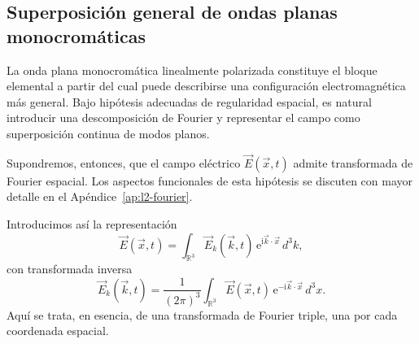\documentclass[12pt,a4paper]{article}
\theoremstyle{definition}
\theoremstyle{plain}
\numberwithin{equation}{section}
\theoremstyle{remark}
\newcommand{\ii}{\mathrm{i}}
\newcommand{\ee}{\mathrm{e}}
\newcommand{\E}{\vec{E}}
\begin{document}
\subsection{Superposición general de ondas planas monocromáticas}

La onda plana monocromática linealmente polarizada constituye el bloque elemental a partir del cual puede describirse una configuración electromagnética más general. Bajo hipótesis adecuadas de regularidad espacial, es natural introducir una descomposición de Fourier y representar el campo como superposición continua de modos planos.

Supondremos, entonces, que el campo eléctrico $\E(\vec x,t)$ admite transformada de Fourier espacial. Los aspectos funcionales de esta hipótesis se discuten con mayor detalle en el Apéndice~\ref{ap:l2-fourier}.

Introducimos así la representación
\begin{equation}
    \vec E(\vec x,t)=\int_{\mathbb R^3}\vec E_k(\vec k,t)\,\ee^{\ii\vec k\cdot\vec x}\,d^3k,
    \label{eq:fourier-E-directa}
\end{equation}
con transformada inversa
\begin{equation*}
    \vec E_k(\vec k,t)=\frac{1}{(2\pi)^3}\int_{\mathbb R^3}\vec E(\vec x,t)\,\ee^{-\ii\vec k\cdot\vec x}\,d^3x.
\end{equation*}
Aquí se trata, en esencia, de una transformada de Fourier triple, una por cada coordenada espacial.
\end{document}
